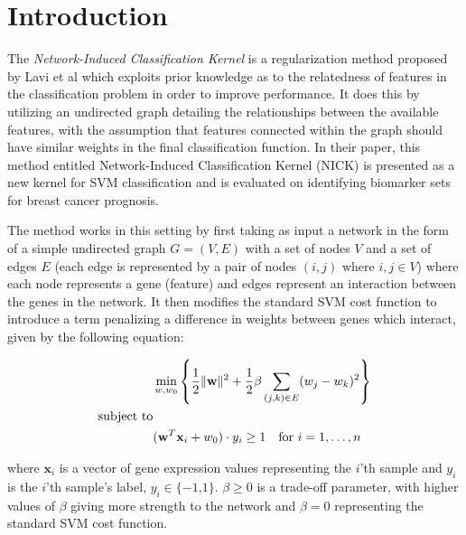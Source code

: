 \section{Introduction}

	The \textit{Network-Induced Classification Kernel} is a regularization method proposed by Lavi et al\cite{Lavi2012} which exploits prior knowledge as to the relatedness of features in the classification problem in order to improve performance.  It does this by utilizing an undirected graph detailing the relationships between the available features, with the assumption that features connected within the graph should have similar weights in the final classification function.  In their paper, this method entitled Network-Induced Classification Kernel (NICK) is presented as a new kernel for SVM classification and is evaluated on identifying biomarker sets for breast cancer prognosis.
	
	The method works in this setting by first taking as input a network in the form of a simple
undirected graph $G = (V, E)$ with a set of nodes $V$ and a set of edges $E$ (each edge is represented by a pair of nodes $(i, j)$ where $i, j \in V$) where each node represents a gene (feature) and edges represent an interaction between the genes in the network. It then modifies the standard SVM cost function to introduce a term penalizing a difference in weights between genes which interact, given by the following equation:

\begin{align*}
	& \min_{w,w_0}
	  \left\lbrace 
	  \frac{1}{2}\|\textbf{w}\|^2 + 
	  \frac{1}{2}\beta \sum_{(j,k) \in E} (w_j - w_k)^2 
	  \right\rbrace \\
	\text{subject to} \hfill \\
	& (\textbf{w}^T\textbf{x}_i + w_0) \cdot y_i \geq 1 \quad \text{for } i = 1, \ldots , n
\end{align*}

\noindent where $\textbf{x}_i$ is a vector of gene expression values representing the $i$’th sample and $y_i$ is the $i$’th sample’s label, $y_i \in \{ - 1‚ 1 \}$. $\beta \geq 0$ is a trade-off parameter, with higher values of $\beta$ giving more strength to the network and $\beta = 0$ representing the standard SVM cost function.